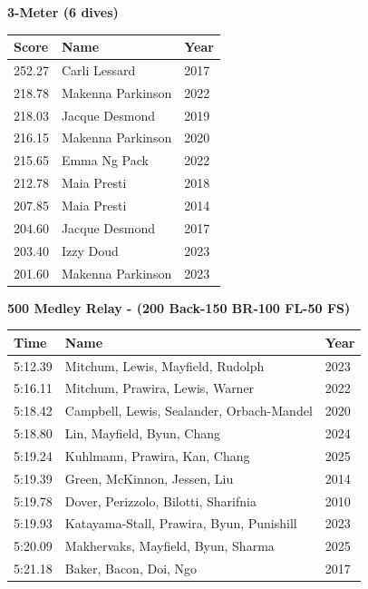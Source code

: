 \noindent\begin{minipage}[t]{0.98\textwidth}
\centering
\textbf{\textcolor{teamprimary}{3-Meter (6 dives)}}\par
\vspace{0.5em}
\centering
\small
\renewcommand{\arraystretch}{1.0}
\setlength{\tabcolsep}{4pt}
\begin{tabular}{@{}p{1.8cm}p{3.0cm}p{1.0cm}@{}}
\toprule
\textbf{Score} & \textbf{Name} & \textbf{Year} \\
\midrule
252.27 & Carli Lessard & 2017 \\
218.78 & Makenna Parkinson & 2022 \\
218.03 & Jacque Desmond & 2019 \\
216.15 & Makenna Parkinson & 2020 \\
215.65 & Emma Ng Pack & 2022 \\
212.78 & Maia Presti & 2018 \\
207.85 & Maia Presti & 2014 \\
204.60 & Jacque Desmond & 2017 \\
203.40 & Izzy Doud & 2023 \\
201.60 & Makenna Parkinson & 2023 \\
\bottomrule
\end{tabular}
\end{minipage}
\vspace{1.2em}
\noindent\begin{minipage}[t]{0.98\textwidth}
\centering
\textbf{\textcolor{teamprimary}{500 Medley Relay - (200 Back-150 BR-100 FL-50 FS)}}\par
\vspace{0.5em}
\centering
\small
\renewcommand{\arraystretch}{1.0}
\setlength{\tabcolsep}{4pt}
\begin{tabular}{@{}p{4.5cm}p{8.5cm}p{2.5cm}@{}}
\toprule
\textbf{Time} & \textbf{Name} & \textbf{Year} \\
\midrule
5:12.39 & Mitchum, Lewis, Mayfield, Rudolph & 2023 \\
5:16.11 & Mitchum, Prawira, Lewis, Warner & 2022 \\
5:18.42 & Campbell, Lewis, Sealander, Orbach-Mandel & 2020 \\
5:18.80 & Lin, Mayfield, Byun, Chang & 2024 \\
5:19.24 & Kuhlmann, Prawira, Kan, Chang & 2025 \\
5:19.39 & Green, McKinnon, Jessen, Liu & 2014 \\
5:19.78 & Dover, Perizzolo, Bilotti, Sharifnia & 2010 \\
5:19.93 & Katayama-Stall, Prawira, Byun, Punishill & 2023 \\
5:20.09 & Makhervaks, Mayfield, Byun, Sharma & 2025 \\
5:21.18 & Baker, Bacon, Doi, Ngo & 2017 \\
\bottomrule
\end{tabular}
\end{minipage}
